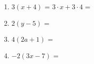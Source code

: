 \begin{enumerate}[label=\arabic*.]
    \begin{enumerate}[label=\alph*)]
        \item $3(x + 4)$ = $3 \cdot x + 3 \cdot 4$ = \underline{\hspace{3cm}}
        \vspace{0.5cm}
        \item $2(y - 5)$ = \underline{\hspace{5cm}}
        \vspace{0.5cm}
        \item $4(2a + 1)$ = \underline{\hspace{5cm}}
        \vspace{0.5cm}
        \item $-2(3x - 7)$ = \underline{\hspace{5cm}}
    \end{enumerate}
\end{enumerate}
